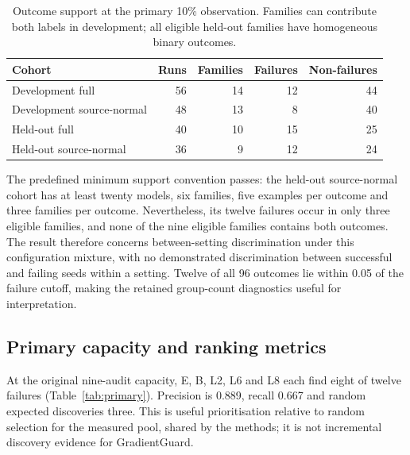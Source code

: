 \documentclass[nolineno]{ieeeaccess}
\begin{document}
\begin{table}[t]
\caption{Outcome support at the primary 10\% observation. Families can contribute both labels in development; all eligible held-out families have homogeneous binary outcomes.}
\label{tab:support}
\centering\small
\setlength{\tabcolsep}{3pt}
\begin{tabular}{@{}>{\raggedright\arraybackslash}p{2.65cm}rrrr@{}}
\toprule Cohort & Runs & Families & Failures & Non-failures\\\midrule
Development full &56&14&12&44\\
Development source-normal &48&13&8&40\\
Held-out full &40&10&15&25\\
Held-out source-normal &36&9&12&24\\\bottomrule
\end{tabular}
\end{table}

The predefined minimum support convention passes: the held-out source-normal cohort has at least twenty models, six families, five examples per outcome and three families per outcome. Nevertheless, its twelve failures occur in only three eligible families, and none of the nine eligible families contains both outcomes. The result therefore concerns between-setting discrimination under this configuration mixture, with no demonstrated discrimination between successful and failing seeds within a setting. Twelve of all 96 outcomes lie within 0.05 of the failure cutoff, making the retained group-count diagnostics useful for interpretation.

\subsection{Primary capacity and ranking metrics}
At the original nine-audit capacity, E, B, L2, L6 and L8 each find eight of twelve failures (Table~\ref{tab:primary}). Precision is 0.889, recall 0.667 and random expected discoveries three. This is useful prioritisation relative to random selection for the measured pool, shared by the methods; it is not incremental discovery evidence for GradientGuard.
\end{document}
